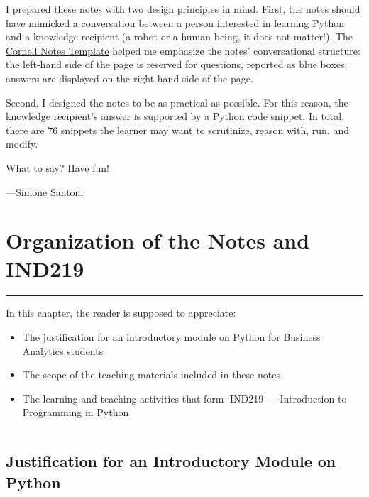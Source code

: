 \documentclass[a4paper,11pt]{book}
\begin{document}
\quad I prepared these notes with two design principles in mind. First, the notes should have mimicked a conversation between a person interested in learning Python and a knowledge recipient (a robot or a human being, it does not matter!).  The \href{https://en.wikipedia.org/wiki/Cornell_Notes}{Cornell Notes Template} helped me emphasize the notes' conversational structure: the left-hand side of the page is reserved for questions, reported as blue boxes; answers are displayed on the right-hand side of the page.

\quad Second, I designed the notes to be as practical as possible. For this reason, the knowledge recipient's answer is supported by a Python code snippet. In total, there are 76 snippets the learner may want to scrutinize, reason with, run, and modify.



\quad What to say? Have fun!

\vspace{2em}

---Simone Santoni


\chapter{Organization of the Notes and IND219}
\label{ch:organization}
\par\noindent\rule{\textwidth}{0.4pt}

In this chapter, the reader is supposed to appreciate:

\begin{itemize}
	\item The justification for an introductory module on Python for Business Analytics students
	\item The scope of the teaching materials included in these notes 
	\item The learning and teaching activities that form `IND219 --- Introduction to Programming in Python
\end{itemize}

\par\noindent\rule{\textwidth}{0.4pt}

\vspace{1em}

\section{Justification for an Introductory Module on Python}
\end{document}
